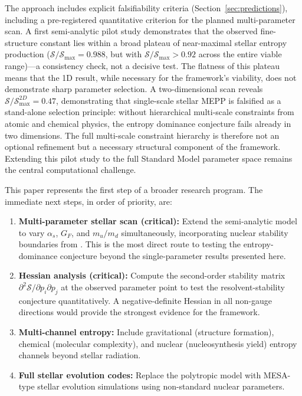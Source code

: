 \documentclass[12pt,a4paper]{article}
\theoremstyle{remark}
\begin{document}
The approach includes explicit falsifiability criteria (Section~\ref{sec:predictions}), including a pre-registered quantitative criterion for the planned multi-parameter scan. A first semi-analytic pilot study demonstrates that the observed fine-structure constant lies within a broad plateau of near-maximal stellar entropy production ($\mathcal{S}/\mathcal{S}_{\max} = 0.988$, but with $\mathcal{S}/\mathcal{S}_{\max} > 0.92$ across the entire viable range)---a consistency check, not a decisive test. The flatness of this plateau means that the 1D result, while necessary for the framework's viability, does not demonstrate sharp parameter selection. A two-dimensional scan reveals $\mathcal{S}/\mathcal{S}_{\max}^{2D} = 0.47$, demonstrating that single-scale stellar MEPP is falsified as a stand-alone selection principle: without hierarchical multi-scale constraints from atomic and chemical physics, the entropy dominance conjecture fails already in two dimensions. The full multi-scale constraint hierarchy is therefore not an optional refinement but a necessary structural component of the framework. Extending this pilot study to the full Standard Model parameter space remains the central computational challenge.

This paper represents the first step of a broader research program. The immediate next steps, in order of priority, are:
\begin{enumerate}
    \item \textbf{Multi-parameter stellar scan (critical):} Extend the semi-analytic model to vary $\alpha_s$, $G_F$, and $m_u/m_d$ simultaneously, incorporating nuclear stability boundaries from \citep{Adams2019}. This is the most direct route to testing the entropy-dominance conjecture beyond the single-parameter results presented here.
    \item \textbf{Hessian analysis (critical):} Compute the second-order stability matrix $\partial^2 \mathcal{S}/\partial p_i \partial p_j$ at the observed parameter point to test the resolvent-stability conjecture quantitatively. A negative-definite Hessian in all non-gauge directions would provide the strongest evidence for the framework.
    \item \textbf{Multi-channel entropy:} Include gravitational (structure formation), chemical (molecular complexity), and nuclear (nucleosynthesis yield) entropy channels beyond stellar radiation.
    \item \textbf{Full stellar evolution codes:} Replace the polytropic model with MESA-type stellar evolution simulations using non-standard nuclear parameters.
\end{enumerate}
\end{document}
